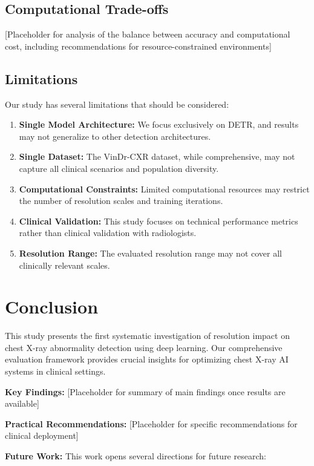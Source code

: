 \documentclass[10pt,twocolumn]{article}
\begin{document}
\subsection{Computational Trade-offs}

[Placeholder for analysis of the balance between accuracy and computational cost, including recommendations for resource-constrained environments]

\subsection{Limitations}

Our study has several limitations that should be considered:

\begin{enumerate}
\item \textbf{Single Model Architecture:} We focus exclusively on DETR, and results may not generalize to other detection architectures.
\item \textbf{Single Dataset:} The VinDr-CXR dataset, while comprehensive, may not capture all clinical scenarios and population diversity.
\item \textbf{Computational Constraints:} Limited computational resources may restrict the number of resolution scales and training iterations.
\item \textbf{Clinical Validation:} This study focuses on technical performance metrics rather than clinical validation with radiologists.
\item \textbf{Resolution Range:} The evaluated resolution range may not cover all clinically relevant scales.
\end{enumerate}

\section{Conclusion}

This study presents the first systematic investigation of resolution impact on chest X-ray abnormality detection using deep learning. Our comprehensive evaluation framework provides crucial insights for optimizing chest X-ray AI systems in clinical settings.

\textbf{Key Findings:} [Placeholder for summary of main findings once results are available]

\textbf{Practical Recommendations:} [Placeholder for specific recommendations for clinical deployment]

\textbf{Future Work:} This work opens several directions for future research:
\end{document}
